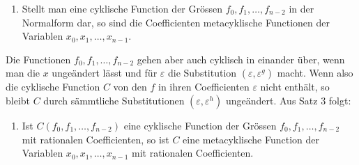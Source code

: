 \documentclass[11pt]{article}
\begin{document}
\begin{enumerate}[resume,label=\arabic*.]
\item Stellt man eine cyklische Function der Gr\"ossen $f_0,f_1,\ldots,f_{n-2}$ in der Normalform dar, so sind die Coefficienten metacyklische Functionen der Variablen $x_0,x_1,\ldots,x_{n-1}$.
\end{enumerate}

Die Functionen $f_0,f_1,\ldots,f_{n-2}$ gehen aber auch cyklisch in einander \"uber, wenn man die $x$ unge\"andert l\"asst und f\"ur $\varepsilon$ die Substitution $(\varepsilon,\varepsilon^g)$ macht. Wenn also die cyklische Function $C$ von den $f$ in ihren Coefficienten $\varepsilon$ nicht enth\"alt, so bleibt $C$ durch s\"ammtliche Substitutionen $(\varepsilon,\varepsilon^h)$ unge\"andert. Aus Satz 3 folgt:

\begin{enumerate}[resume,label=\arabic*.]
\item Ist $C(f_0,f_1,\ldots,f_{n-2})$ eine cyklische Function der Gr\"ossen $f_0,f_1,\ldots,f_{n-2}$ mit rationalen Coefficienten, so ist $C$ eine metacyklische Function der Variablen $x_0,x_1,\ldots,x_{n-1}$ mit rationalen Coefficienten.
\end{enumerate}
\end{document}
